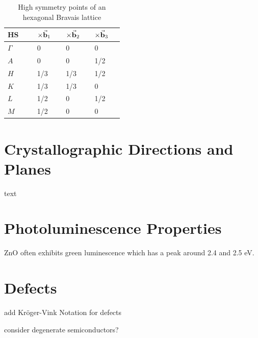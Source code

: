 \begin{table}[tbh!]
	\centering
	\caption{High symmetry points of an hexagonal Bravais lattice}
	\label{tab:HS}
	\begin{tabular}[t]{K{0.15\linewidth}K{0.1\linewidth}K{0.1\linewidth}K{0.1\linewidth}}
	\toprule
	\textbf{HS} & $\times \va{b}_1$ & $\times \va{b}_2$ & $\times \va{b}_3$ \\ \midrule
	$\Gamma$ & 0 & 0 & 0 \\
	$A$ & 0 & 0 & 1/2 \\
	$H$ & 1/3 & 1/3 & 1/2 \\
	$K$ & 1/3 & 1/3 & 0 \\
	$L$ & 1/2 & 0 & 1/2 \\
	$M$ & 1/2 & 0 & 0 \\ \bottomrule
	\end{tabular}
\end{table}

\clearpage


\section{Crystallographic Directions and Planes}
text
\section{Photoluminescence Properties}
ZnO often exhibits green luminescence which has a peak around 2.4 and 2.5 eV.
\section{Defects}
add Kröger-Vink Notation for defects

consider degenerate semiconductors?

 